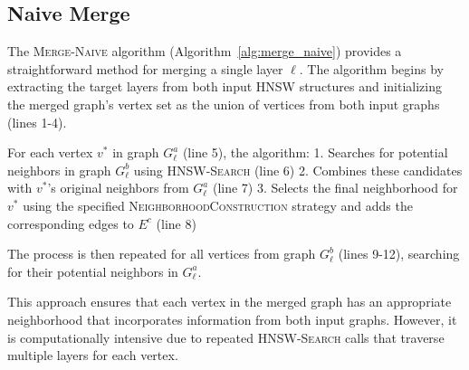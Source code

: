 \documentclass{article}
\begin{document}

\subsection{Naive Merge}
The \textsc{Merge-Naive} algorithm (Algorithm~\ref{alg:merge_naive}) provides a straightforward method for merging a single layer $\ell$. The algorithm begins by extracting the target layers from both input HNSW structures and initializing the merged graph's vertex set as the union of vertices from both input graphs (lines 1-4).

For each vertex $v^*$ in graph $G^a_\ell$ (line 5), the algorithm:
1. Searches for potential neighbors in graph $G^b_\ell$ using \textsc{HNSW-Search} (line 6)
2. Combines these candidates with $v^*$'s original neighbors from $G^a_\ell$ (line 7)
3. Selects the final neighborhood for $v^*$ using the specified \textsc{NeighborhoodConstruction} strategy and adds the corresponding edges to $E^c$ (line 8)

The process is then repeated for all vertices from graph $G^b_\ell$ (lines 9-12), searching for their potential neighbors in $G^a_\ell$.

This approach ensures that each vertex in the merged graph has an appropriate neighborhood that incorporates information from both input graphs. However, it is computationally intensive due to repeated \textsc{HNSW-Search} calls that traverse multiple layers for each vertex.
\end{document}

